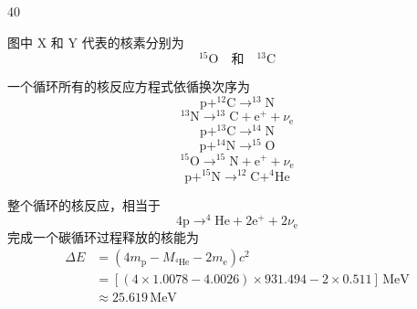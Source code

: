\begin{solution}{40}
    \begin{subsolution}
        图中 X 和 Y 代表的核素分别为
        \begin{equation}
            ^{15}\mathrm{O} \quad \text{和} \quad ^{13}\mathrm{C}
            \label{eq:1.s40}
        \end{equation}
    \end{subsolution}
    \begin{subsolution}
        一个循环所有的核反应方程式依循换次序为
        \begin{equation}
            \mathrm{p} + ^{12}\mathrm{C} \rightarrow ^{13}\mathrm{N}
            \label{eq:2.s40}
        \end{equation}
        \begin{equation}
            ^{13}\mathrm{N} \rightarrow ^{13}\mathrm{C} + \mathrm{e}^{+} + \nu_{\mathrm{e}}
            \label{eq:3.s40}
        \end{equation}
        \begin{equation}
            \mathrm{p} + ^{13}\mathrm{C} \rightarrow ^{14}\mathrm{N}
            \label{eq:4.s40}
        \end{equation}
        \begin{equation}
            \mathrm{p} + ^{14}\mathrm{N} \rightarrow ^{15}\mathrm{O}
            \label{eq:5.s40}
        \end{equation}
        \begin{equation}
            ^{15}\mathrm{O} \rightarrow ^{15}\mathrm{N} + \mathrm{e}^{+} + \nu_{\mathrm{e}}
            \label{eq:6.s40}
        \end{equation}
        \begin{equation}
            \mathrm{p} + ^{15}\mathrm{N} \rightarrow ^{12}\mathrm{C} + ^{4}\mathrm{He}
            \label{eq:7.s40}
        \end{equation}
    \end{subsolution}
    \begin{subsolution}
        整个循环的核反应，相当于
        \begin{equation}
            4\mathrm{p} \rightarrow ^{4}\mathrm{He} + 2\mathrm{e}^{+} + 2\nu_{\mathrm{e}}
            \label{eq:8.s40}
        \end{equation}
        完成一个碳循环过程释放的核能为
        \begin{equation}
            \begin{aligned}
                \Delta E &= (4m_{\mathrm{p}} - M_{^{4}\mathrm{He}} - 2m_{\mathrm{e}})c^{2} \\
                &= \left[(4\times 1.0078 - 4.0026)\times 931.494 - 2\times 0.511\right]\,\mathrm{MeV} \\
                &\approx 25.619\,\mathrm{MeV}
            \end{aligned}
            \label{eq:9.s40}
        \end{equation}
    \end{subsolution}
\end{solution}